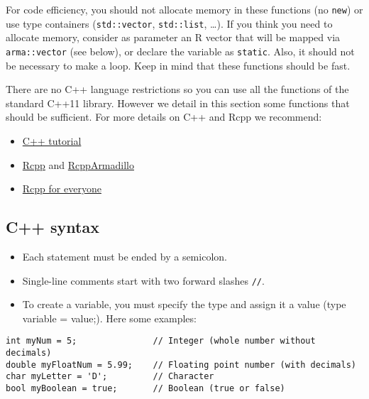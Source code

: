 For code efficiency, you should not allocate memory in these functions (no \texttt{new}) or use type containers (\texttt{std::vector}, \texttt{std::list}, \ldots). If you think you need to allocate memory, consider as parameter an R vector that will be mapped via \texttt{arma::vector} (see below), or declare the variable as \texttt{static}.
Also, it should not be necessary to make a loop. Keep in mind that these functions should be fast.

There are no C++ language restrictions so you can use all the functions of the standard C++11 library. However we detail in this section some functions that should be sufficient. For more details on C++ and Rcpp we recommend:

\begin{itemize}
\tightlist
\item
  \href{https://www.cplusplus.com/doc/tutorial/}{C++ tutorial}
\item
  \href{http://dirk.eddelbuettel.com/code/rcpp.html}{Rcpp} and \href{http://dirk.eddelbuettel.com/code/rcpp.armadillo.html}{RcppArmadillo}
\item
  \href{https://teuder.github.io/rcpp4everyone_en/}{Rcpp for everyone}
\end{itemize}

\hypertarget{c-syntax}{%
\subsection{C++ syntax}\label{c-syntax}}

\begin{itemize}
\tightlist
\item
  Each statement must be ended by a semicolon.
\item
  Single-line comments start with two forward slashes \texttt{//}.
\item
  To create a variable, you must specify the type and assign it a value (type variable = value;). Here some examples:
\end{itemize}

\begin{verbatim}
int myNum = 5;               // Integer (whole number without decimals)
double myFloatNum = 5.99;    // Floating point number (with decimals)
char myLetter = 'D';         // Character
bool myBoolean = true;       // Boolean (true or false)
\end{verbatim}

